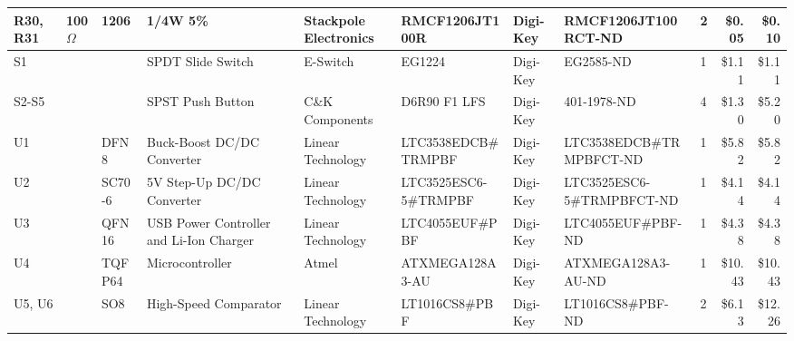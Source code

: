 \documentclass{article}
\begin{document}
\begin{center}
\begin{tabular}{| l | l | l | l | l | l | l | l | l | r | r |}
      \hline
      R30, R31                &  100$\Omega$     &  1206              &  1/4W 5\%                                 &  Stackpole Electronics  &  RMCF1206JT100R                 &  Digi-Key           &  RMCF1206JT100RCT-ND         &  2             &  \$0.05              &  \$0.10 \\
      \hline
      S1                      &                  &                    &  SPDT Slide Switch                        &  E-Switch               &  EG1224                         &  Digi-Key           &  EG2585-ND                   &  1             &  \$1.11              &  \$1.11 \\
      \hline
      S2-S5                   &                  &                    &  SPST Push Button                         &  C\&K Components        &  D6R90 F1 LFS                   &  Digi-Key           &  401-1978-ND                 &  4             &  \$1.30              &  \$5.20 \\
      \hline
      U1                      &                  &  DFN8              &  Buck-Boost DC/DC Converter               &  Linear Technology      &  LTC3538EDCB\#TRMPBF            &  Digi-Key           &  LTC3538EDCB\#TRMPBFCT-ND    &  1             &  \$5.82              &  \$5.82 \\
      \hline
      U2                      &                  &  SC70-6            &  5V Step-Up DC/DC Converter               &  Linear Technology      &  LTC3525ESC6-5\#TRMPBF          &  Digi-Key           &  LTC3525ESC6-5\#TRMPBFCT-ND  &  1             &  \$4.14              &  \$4.14 \\
      \hline
      U3                      &                  &  QFN16             &  USB Power Controller and Li-Ion Charger  &  Linear Technology      &  LTC4055EUF\#PBF                &  Digi-Key           &  LTC4055EUF\#PBF-ND          &  1             &  \$4.38              &  \$4.38 \\
      \hline
      U4                      &                  &  TQFP64            &  Microcontroller                          &  Atmel                  &  ATXMEGA128A3-AU                &  Digi-Key           &  ATXMEGA128A3-AU-ND          &  1             &  \$10.43             &  \$10.43 \\
      \hline
      U5, U6                  &                  &  SO8               &  High-Speed Comparator                    &  Linear Technology      &  LT1016CS8\#PBF                 &  Digi-Key           &  LT1016CS8\#PBF-ND           &  2             &  \$6.13              &  \$12.26 \\

\end{tabular}
\end{center}
\end{document}
